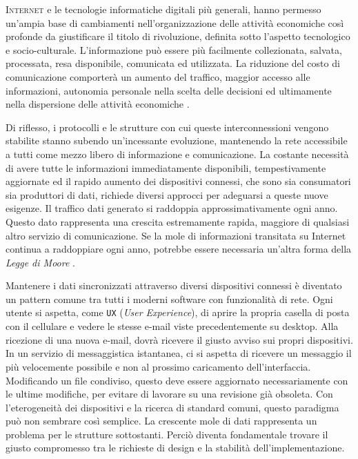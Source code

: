 \lettrine{I}{nternet} e le tecnologie informatiche digitali più generali, hanno permesso un'ampia base di cambiamenti nell'organizzazione delle attività economiche così profonde da giustificare il titolo di rivoluzione, definita sotto l'aspetto tecnologico e socio-culturale.
L'informazione può essere più facilmente collezionata, salvata, processata, resa disponibile, comunicata ed utilizzata.
La riduzione del costo di comunicazione comporterà un aumento del traffico, maggior accesso alle informazioni, autonomia personale nella scelta delle decisioni ed ultimamente nella dispersione delle attività economiche \cite{InternetRevolution}.

Di riflesso, i protocolli e le strutture con cui queste interconnessioni vengono stabilite stanno subendo un'incessante evoluzione, mantenendo la rete accessibile a tutti come mezzo libero di informazione e comunicazione.
La costante necessità di avere tutte le informazioni immediatamente disponibili, tempestivamente aggiornate ed il rapido aumento dei dispositivi connessi, che sono sia consumatori sia produttori di dati, richiede diversi approcci per adeguarsi a queste nuove esigenze.
Il traffico dati generato si raddoppia approssimativamente ogni anno. Questo dato rappresenta una crescita estremamente rapida, maggiore di qualsiasi altro servizio di comunicazione.
Se la mole di informazioni transitata su Internet continua a raddoppiare ogni anno, potrebbe essere necessaria un'altra forma della \textit{Legge di Moore} \cite{Moore}.

Mantenere i dati sincronizzati attraverso diversi dispositivi connessi è diventato un pattern comune tra tutti i moderni software con funzionalità di rete.
Ogni utente si aspetta, come \verb+UX+ (\textit{User Experience}), di aprire la propria casella di posta con il cellulare e vedere le stesse e-mail viste precedentemente su desktop. Alla ricezione di una nuova e-mail, dovrà ricevere il giusto avviso sui propri dispositivi.
In un servizio di messaggistica istantanea, ci si aspetta di ricevere un messaggio il più velocemente possibile e non al prossimo caricamento dell'interfaccia.
Modificando un file condiviso, questo deve essere aggiornato necessariamente con le ultime modifiche, per evitare di lavorare su una revisione già obsoleta.
Con l'eterogeneità dei dispositivi e la ricerca di standard comuni, questo paradigma può non sembrare così semplice.
La crescente mole di dati rappresenta un problema per le strutture sottostanti.
Perciò diventa fondamentale trovare il giusto compromesso tra le richieste di design e la stabilità dell'implementazione.

